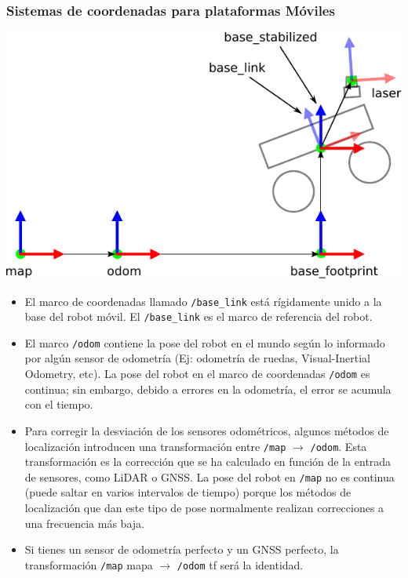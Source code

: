 \begin{frame}[fragile]
    \frametitle{Sistemas de coordenadas para plataformas Móviles}
    \scriptsize
    \begin{center}
        \includegraphics[width=0.3\columnwidth]{images/ros_coordinate_systems.pdf}
    \end{center}
    
    \begin{itemize}
        \item El marco de coordenadas llamado \lstinline[style=bash]{/base_link} está rígidamente unido a la base del robot móvil. El \lstinline[style=bash]{/base_link} es el marco de referencia del robot.
        
        \item El marco \lstinline[style=bash]{/odom} contiene la pose del robot en el mundo según lo informado por algún sensor de odometría (Ej: odometría de ruedas, Visual-Inertial Odometry, etc). La pose del robot en el marco de coordenadas \lstinline[style=bash]{/odom} es continua; sin embargo, debido a errores en la odometría, el error se acumula con el tiempo.
        
        \item Para corregir la desviación de los sensores odométricos, algunos métodos de localización introducen una transformación entre \lstinline[style=bash]{/map} $\rightarrow$ \lstinline[style=bash]{/odom}. Esta transformación es la corrección que se ha calculado en función de la entrada de sensores, como LiDAR o GNSS. La pose del robot en \lstinline[style=bash]{/map} no es continua (puede saltar en varios intervalos de tiempo) porque los métodos de localización que dan este tipo de pose normalmente realizan correcciones a una frecuencia más baja.
        
        \item Si tienes un sensor de odometría perfecto y un GNSS perfecto, la transformación \lstinline[style=bash]{/map} mapa $\rightarrow$ \lstinline[style=bash]{/odom} tf será la identidad.
        
        
    \end{itemize}
    
\end{frame}



